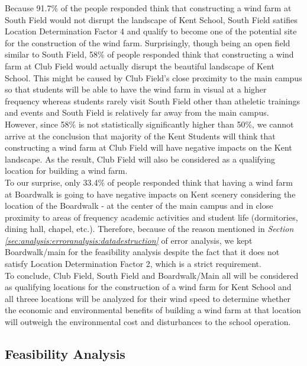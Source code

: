 \documentclass[review]{elsarticle}
\begin{document}
Because 91.7\% of the people responded think that constructing a wind farm at South Field would not disrupt the landscape of Kent School, South Field satifies Location Determination Factor 4 
and qualify to become one of the potential site for the construction of the wind farm. Surprisingly, though being an open field similar to South Field, 58\% of people responded think that constructing
a wind farm at Club Field would actually disrupt the beautiful landscape of Kent School. This might be caused by Club Field's close proximity to the main campus so that students will be able to 
have the wind farm in visual at a higher frequency whereas students rarely visit South Field other than atheletic trainings and events and South Field is relatively far away from the main campus. 
However, since 58\% is not statistically significantly higher than 50\%, we cannot arrive at the conclusion that majority of the Kent Students will think that constructing a wind farm at Club Field 
will have negative impacts on the Kent landscape. As the result, Club Field will also be considered as a qualifying location for building a wind farm.
\\\indent To our surprise, only 33.4\% of people responded think that having a wind farm at Boardwalk is going to have negative impacts on Kent scenery considering the location of the Boardwalk - at the center of 
the main campus and in close proximity to areas of frequency academic activities and student life (dormitories, dining hall, chapel, etc.). Therefore, because of the reason mentioned in \textit{Section \ref{sec:analysis:erroranalysis:datadestruction}} of 
error analysis, we kept Boardwalk/main for the feasibility analysis despite the fact that it does not satisfy Location Determination Factor 2, which is a strict requirement.
\\\indent To conclude, Club Field, South Field and Boardwalk/Main all will be considered as qualifying locations for the construction of a wind farm for Kent School and all threee locations will be analyzed 
for their wind speed to determine whether the economic and environmental benefits of building a wind farm at that location will outweigh the environmental cost and disturbances to the school operation.


\subsection{Feasibility Analysis}
\end{document}
